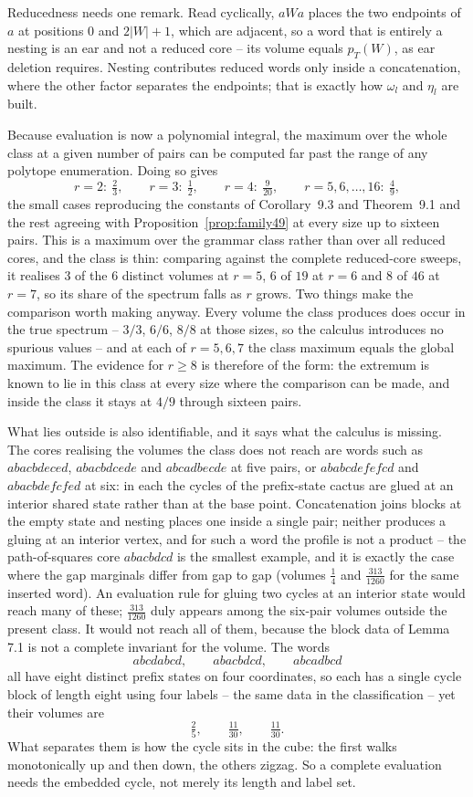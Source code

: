 Reducedness needs one remark.  Read cyclically, $aWa$ places the two
endpoints of $a$ at positions $0$ and $2|W|+1$, which are adjacent, so a
word that is entirely a nesting is an ear and not a reduced core -- its
volume equals $p_T(W)$, as ear deletion requires.  Nesting contributes
reduced words only inside a concatenation, where the other factor
separates the endpoints; that is exactly how $\omega_l$ and $\eta_l$ are
built.

Because evaluation is now a polynomial integral, the maximum over the
whole class at a given number of pairs can be computed far past the
range of any polytope enumeration.  Doing so gives
\[
r=2:\ \tfrac23,\qquad r=3:\ \tfrac12,\qquad r=4:\ \tfrac9{20},\qquad
r=5,6,\dots,16:\ \tfrac49 ,
\]
the small cases reproducing the constants of Corollary~9.3 and
Theorem~9.1 and the rest agreeing with
Proposition~\ref{prop:family49} at every size up to sixteen pairs.  This
is a maximum over the grammar class rather than over all reduced cores,
and the class is thin: comparing against the complete reduced-core
sweeps, it realises $3$ of the $6$ distinct volumes at $r=5$, $6$ of
$19$ at $r=6$ and $8$ of $46$ at $r=7$, so its share of the spectrum
falls as $r$ grows.  Two things make the comparison worth making
anyway.  Every volume the class produces does occur in the true
spectrum -- $3/3$, $6/6$, $8/8$ at those sizes, so the calculus
introduces no spurious values -- and at each of $r=5,6,7$ the class
maximum equals the global maximum.  The evidence for $r\ge8$ is
therefore of the form: the extremum is known to lie in this class at
every size where the comparison can be made, and inside the class it
stays at $4/9$ through sixteen pairs.

What lies outside is also identifiable, and it says what the calculus is
missing.  The cores realising the volumes the class does not reach are
words such as $abacbdeced$, $abacbdcede$ and $abcadbecde$ at five pairs,
or $ababcdefefcd$ and $abacbdefcfed$ at six: in each the cycles of the
prefix-state cactus are glued at an interior shared state rather than at
the base point.  Concatenation joins blocks at the empty state and
nesting places one inside a single pair; neither produces a gluing at an
interior vertex, and for such a word the profile is not a product -- the
path-of-squares core $abacbdcd$ is the smallest example, and it is
exactly the case where the gap marginals differ from gap to gap
(volumes $\tfrac14$ and $\tfrac{313}{1260}$ for the same inserted word).
An evaluation rule for gluing two cycles at an interior state would
reach many of these; $\tfrac{313}{1260}$ duly appears among the six-pair
volumes outside the present class.  It would not reach all of them,
because the block data of Lemma 7.1 is not a complete invariant for the
volume.  The words
\[
abcdabcd,\qquad abacbdcd,\qquad abcadbcd
\]
all have eight distinct prefix states on four coordinates, so each has a
single cycle block of length eight using four labels -- the same data in
the classification -- yet their volumes are
\[
\tfrac25,\qquad \tfrac{11}{30},\qquad \tfrac{11}{30}.
\]
What separates them is how the cycle sits in the cube: the first walks
monotonically up and then down, the others zigzag.  So a complete
evaluation needs the embedded cycle, not merely its length and label
set.

